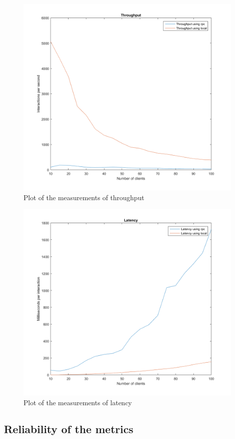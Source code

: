 \documentclass{article}
\theoremstyle{plain}
\theoremstyle{nonumberplain}
\begin{document}
\centering
\begin{figure}
	\hspace*{-2.2in}
	\includegraphics[scale=0.85]{throughput}
	\caption{Plot of the measurements of throughput}
\end{figure}
\begin{figure}
	\hspace*{-2.2in}
	\includegraphics[scale=0.85]{latency}
	\caption{Plot of the measurements of latency}
\end{figure}

\subsection{Reliability of the metrics}
\end{document}
